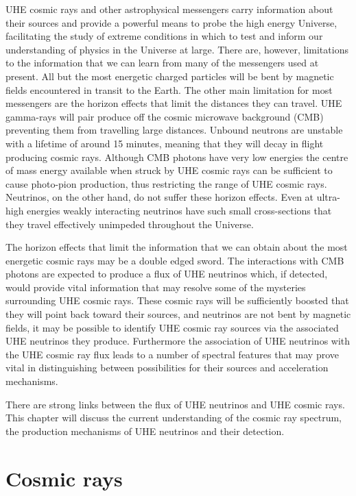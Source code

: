 UHE cosmic rays and other astrophysical messengers carry information about their sources and provide a powerful means to probe the high energy Universe, facilitating the study of extreme conditions in which to test and inform our understanding of physics in the Universe at large. There are, however, limitations to the information that we can learn from many of the messengers used at present. All but the most energetic charged particles will be bent by magnetic fields encountered in transit to the Earth. The other main limitation for most messengers are the horizon effects that limit the distances they can travel. UHE gamma-rays will pair produce \Pelectron\Ppositron off the cosmic microwave background (CMB) preventing them from travelling large distances. Unbound neutrons are unstable with a lifetime of around 15 minutes, meaning that they will decay in flight producing cosmic rays. Although CMB photons have very low energies the centre of mass energy available when struck by UHE cosmic rays can be sufficient to cause photo-pion production, thus restricting the range of UHE cosmic rays. Neutrinos, on the other hand, do not suffer these horizon effects. Even at ultra-high energies weakly interacting neutrinos have such small cross-sections that they travel effectively unimpeded throughout the Universe. 

The horizon effects that limit the information that we can obtain about the most energetic cosmic rays may be a double edged sword. The interactions with CMB photons are expected to produce a flux of UHE neutrinos which, if detected, would provide vital information that may resolve some of the mysteries surrounding UHE cosmic rays. These cosmic rays will be sufficiently boosted that they will point back toward their sources, and neutrinos are not bent by magnetic fields, it may be possible to identify UHE cosmic ray sources via the associated UHE neutrinos they produce. Furthermore the association of UHE neutrinos with the UHE cosmic ray flux leads to a number of spectral features that may prove vital in distinguishing between possibilities for their sources and acceleration mechanisms.

There are strong links between the flux of UHE neutrinos and UHE cosmic rays. This chapter will discuss the current understanding of the cosmic ray spectrum, the production mechanisms of UHE neutrinos and their detection.

\section{Cosmic rays}
\label{section:uhe-app:Cosmic-Rays}


